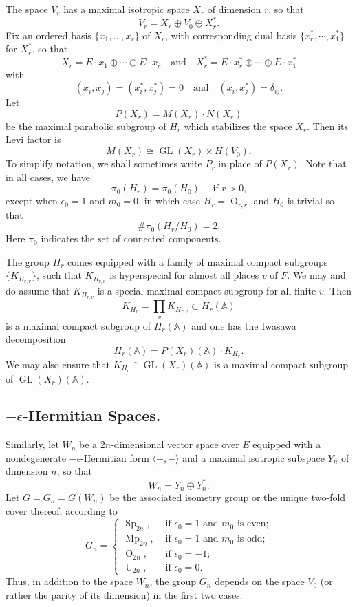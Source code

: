\documentclass[10pt]{amsart}
\theoremstyle{plain}
\numberwithin{equation}{section}
\begin{document}
The space $V_r$ has  a maximal isotropic space $X_r$ of dimension $r$, so that
\[  V_r =  X_r  \oplus  V_0 \oplus X_r^*. \]
  Fix an ordered basis $\{x_1,\dots,x_r\}$ of $X_r$, with corresponding dual basis $\{x_r^*, \cdots ,x_1^* \}$ for $X_r^*$, so that
\[  X_r  = E \cdot x_1  \oplus\cdots \oplus E \cdot x_r \quad \text{and} \quad  
 X_r^*  = E \cdot x_r^*  \oplus\cdots\oplus E \cdot x_1^* \]
 with
 \[  (x_i, x_j) = (x_i^*, x_j^*) = 0 \quad \text{and} \quad (x_i, x_j^*) = \delta_{ij}. \]
Let 
\[ P(X_r) = M(X_r) \cdot N(X_r)\]
 be the maximal parabolic subgroup of $H_r$ which stabilizes the space
 $X_r$. Then its Levi factor is 
\[  M(X_r) \cong {\operatorname{GL}}(X_r) \times H(V_0).\]
To simplify notation, we shall sometimes write $P_r$ in place of $P(X_r)$. Note that in all cases, we have
\[ \pi_0(H_r) = \pi_0(H_0)  \quad \text{  if $r > 0$,} \]
except when $\epsilon_0 =1$ and $m_0 = 0$, in which case $H_r = {\operatorname{O}}_{r,r}$ and $H_0 $ is trivial so that
\[  \# \pi_0(H_r/ H_0)  = 2. \]
Here $\pi_0$ indicates the set of connected components. 
\vskip 5pt

 The group $H_r$ comes equipped with a family of maximal compact subgroups $\{ K_{H_{r,v}} \}$, such that $K_{H_{r,v}}$ is hyperspecial for almost all places $v$ of $F$. We may and do assume that $K_{H_{r,v}}$ is a special maximal compact subgroup for all finite $v$. Then
 \[  K_{H_r} = \prod_v K_{H_{r,v}}\subset H_r({\mathbb{A}}) \]
 is a maximal compact subgroup of $H_r({\mathbb{A}})$ and one has the Iwasawa decomposition
 \[  H_r({\mathbb{A}}) = P(X_r)({\mathbb{A}}) \cdot K_{H_r}. \]
 We may also ensure that $K_{H_r} \cap {\operatorname{GL}}(X_r)({\mathbb{A}})$ is a maximal compact subgroup of ${\operatorname{GL}}(X_r)({\mathbb{A}})$. 
\vskip 5pt

\subsection{\bf $-\epsilon$-Hermitian Spaces.}
Similarly, let $W_n$ be a $2n$-dimensional vector space over $E$
equipped with a nondegenerate $-\epsilon$-Hermitian form $\langle- , -
\rangle$ and a maximal isotropic subspace $Y_n$ of dimension $n$, so
that
\[  W_n  = Y_n   \oplus Y_n^*.\]
 Let $G = G_n =  G(W_n)$ be  the associated isometry group or the
 unique two-fold cover thereof, according to
\[  G_n  = \begin{cases} 
{\operatorname{Sp}}_{2n}, &\text{  if $\epsilon_0=1$ and $m_0$ is even;} \\
{\operatorname{Mp}}_{2n}, &\text{  if $\epsilon_0 = 1$ and $m_0$ is odd;}\\
{\operatorname{O}}_{2n}, &\text{  if $\epsilon_0 = -1$;} \\
{\operatorname{U}}_{2n}, &\text{  if $\epsilon_0 = 0$.}  \end{cases} \]
Thus, in addition to the space $W_n$, the group $G_n$ depends on the space $V_0$ (or rather the parity of its dimension) in the first two cases.  
\vskip 5pt
\end{document}
